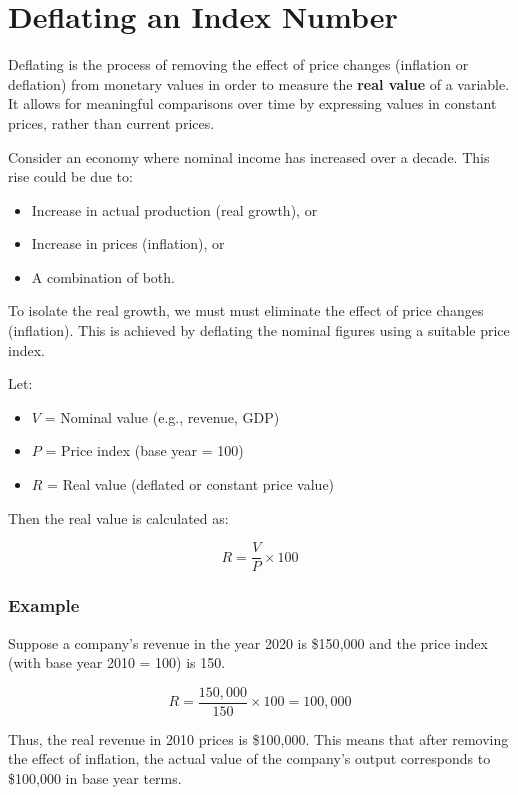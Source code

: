 \documentclass[twoside]{book}
\begin{document}
\section{Deflating an Index Number}

Deflating is the process of removing the effect of price changes (inflation or deflation) from monetary values in order to measure the \textbf{real value} of a variable. It allows for meaningful comparisons over time by expressing values in constant prices, rather than current prices.

Consider an economy where nominal income has increased over a decade. This rise could be due to:

\begin{itemize}
\item Increase in actual production (real growth), or

\item Increase in prices (inflation), or

\item A combination of both.
\end{itemize}

To isolate the real growth, we must must eliminate the effect of price changes (inflation). This is achieved by deflating the nominal figures using a suitable price index.

Let:
\begin{itemize}
  \item \( V \) = Nominal value (e.g., revenue, GDP)
  \item \( P \) = Price index (base year = 100)
  \item \( R \) = Real value (deflated or constant price value)
\end{itemize}

Then the real value is calculated as:
\begin{textbox}
\[
R = \frac{V}{P} \times 100
\]
\end{textbox}

\subsubsection{Example}

Suppose a company's revenue in the year 2020 is \$150{,}000 and the price index (with base year 2010 = 100) is 150.

\[
R = \dfrac{150{,}000}{150} \times 100 = 100{,}000
\]

Thus, the real revenue in 2010 prices is \$100{,}000. This means that after removing the effect of inflation, the actual value of the company's output corresponds to \$100{,}000 in base year terms.
\end{document}
